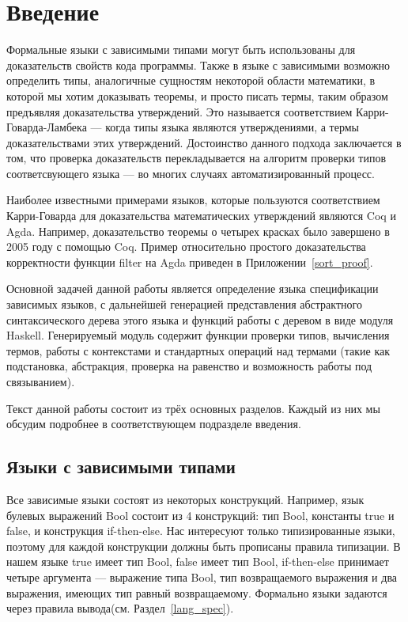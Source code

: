 \section*{Введение}
Формальные языки с зависимыми типами могут быть использованы для доказательств свойств кода программы. Также в языке с зависимыми возможно определить типы, аналогичные сущностям некоторой области математики, в которой мы хотим доказывать теоремы, и просто писать термы, таким образом предъявляя доказательства утверждений. Это называется соответствием Карри-Говарда-Ламбека\cite{curry_how} --- когда типы языка являются утверждениями, а термы доказательствами этих утверждений. Достоинство данного подхода заключается в том, что проверка доказательств перекладывается на алгоритм проверки типов соответсвующего языка --- во многих случаях автоматизированный процесс.

Наиболее известными примерами языков, которые пользуются соответствием Карри-Говарда для доказательства математических утверждений являются Coq\cite{coq} и Agda\cite{agda}. Например, доказательство теоремы о четырех красках было завершено в 2005 году с помощью Coq\cite{weisstein2002four}.
Пример относительно простого доказательства корректности функции filter на Agda приведен в Приложении~\ref{sort_proof}.

Основной задачей данной работы является определение языка спецификации зависимых языков, с дальнейшей генерацией представления абстрактного синтаксического дерева этого языка и функций работы с деревом в виде модуля Haskell\cite{haskell}. Генерируемый модуль содержит функции проверки типов, вычисления термов, работы с контекстами и стандартных операций над термами (такие как подстановка, абстракция, проверка на равенство и возможность работы под связыванием).

Текст данной работы состоит из трёх основных разделов. Каждый из них мы обсудим подробнее в соответствующем подразделе введения.

\subsection*{Языки с зависимыми типами}

Все зависимые языки состоят из некоторых конструкций. Например, язык булевых выражений Bool состоит из 4 конструкций: тип Bool, константы true и false, и конструкция if-then-else. Нас интересуют только типизированные языки, поэтому для каждой конструкции должны быть прописаны правила типизации. В нашем языке true имеет тип Bool, false имеет тип Bool, if-then-else принимает четыре аргумента --- выражение типа Bool, тип возвращаемого выражения и два выражения, имеющих тип равный возвращаемому. Формально языки задаются через правила вывода(см. Раздел~\ref{lang_spec}).

